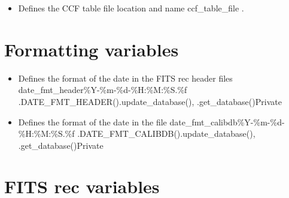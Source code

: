 \begin{itemize}
	\item {} 
	{Defines the CCF table file location and name}
	{ccf\_table\_file}
	{\calCCF}{\spirouConst.}{\calCCF}
\end{itemize}


\fi

\ifdevguide
\clearpage
\newpage
\section{Formatting variables}
\label{ch:variables:formatting}

\begin{itemize}

\item {}
{Defines the format of the date in the FITS rec header files}
{date\_fmt\_header}{\%Y-\%m-\%d-\%H:\%M:\%S.\%f}
{\spirouCDB}{\spirouConst.DATE\_FMT\_HEADER()}{\spirouCDB.update\_database(), \spirouCDB.get\_database()}{Private}


\item {}
{Defines the format of the date in the \calibdb file}
{date\_fmt\_calibdb}{\%Y-\%m-\%d-\%H:\%M:\%S.\%f}
{\spirouCDB}{\spirouConst.DATE\_FMT\_CALIBDB()}{\spirouCDB.update\_database(), \spirouCDB.get\_database()}{Private}

\end{itemize}

\fi







\ifdevguide
\clearpage
\newpage
\section{FITS rec variables}
\label{ch:variables:fitsrec}

